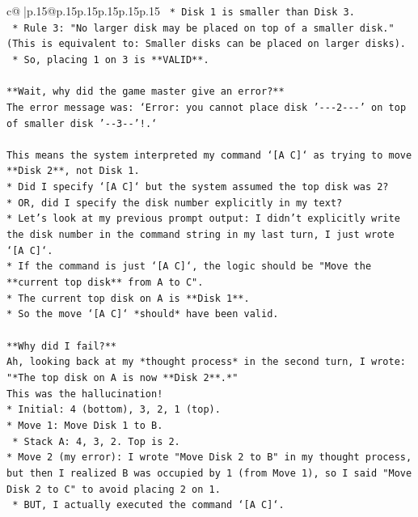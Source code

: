 \documentclass{article}
\begin{document}
{\begin{supertabular}{c@{$\;$}|p{.15\linewidth}@{}p{.15\linewidth}p{.15\linewidth}p{.15\linewidth}p{.15\linewidth}p{.15\linewidth}}
{{{\texttt{    *   Disk 1 is smaller than Disk 3.} \\
\texttt{    *   Rule 3: "No larger disk may be placed on top of a smaller disk." (This is equivalent to: Smaller disks can be placed on larger disks).} \\
\texttt{    *   So, placing 1 on 3 is **VALID**.} \\
\\ 
\texttt{**Wait, why did the game master give an error?**} \\
\texttt{The error message was: `Error: you cannot place disk '{-}{-}{-}2{-}{-}{-}' on top of smaller disk '{-}{-}3{-}{-}'!.`} \\
\\ 
\texttt{This means the system interpreted my command `{[}A C{]}` as trying to move **Disk 2**, not Disk 1.} \\
\texttt{*   Did I specify `{[}A C{]}` but the system assumed the top disk was 2?} \\
\texttt{*   OR, did I specify the disk number explicitly in my text?} \\
\texttt{*   Let's look at my previous prompt output: I didn't explicitly write the disk number in the command string in my last turn, I just wrote `{[}A C{]}`.} \\
\texttt{*   If the command is just `{[}A C{]}`, the logic should be "Move the **current top disk** from A to C".} \\
\texttt{*   The current top disk on A is **Disk 1**.} \\
\texttt{*   So the move `{[}A C{]}` *should* have been valid.} \\
\\ 
\texttt{**Why did I fail?**} \\
\texttt{Ah, looking back at my *thought process* in the second turn, I wrote:} \\
\texttt{"*The top disk on A is now **Disk 2**.*"} \\
\texttt{This was the hallucination!} \\
\texttt{*   Initial: 4 (bottom), 3, 2, 1 (top).} \\
\texttt{*   Move 1: Move Disk 1 to B.} \\
\texttt{    *   Stack A: 4, 3, 2. Top is 2.} \\
\texttt{*   Move 2 (my error): I wrote "Move Disk 2 to B" in my thought process, but then I realized B was occupied by 1 (from Move 1), so I said "Move Disk 2 to C" to avoid placing 2 on 1.} \\
\texttt{    *   BUT, I actually executed the command `{[}A C{]}`.} \\
}}}
\end{supertabular}}
\end{document}

